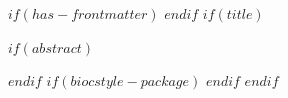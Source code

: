 $if(has-frontmatter)$
\frontmatter
$endif$
$if(title)$
\maketitle
$if(abstract)$
\begin{abstract}
$abstract$
\end{abstract}
$endif$
$if(biocstyle-package)$
$endif$
$endif$
